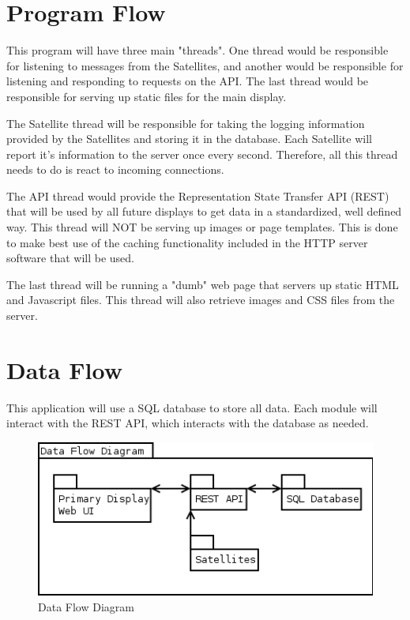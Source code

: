 \section{Program Flow}

This program will have three main "threads".
One thread would be responsible for listening to messages from the Satellites, and another would be responsible for listening and responding to requests on the \ac{API}.
The last thread would be responsible for serving up static files for the main display.

The Satellite thread will be responsible for taking the logging information provided by the Satellites and storing it in the database.
Each Satellite will report it's information to the server once every second.
Therefore, all this thread needs to do is react to incoming connections.

The \ac{API} thread would provide the Representation State Transfer \ac{API} (\ac{REST}) that will be used by all future displays to get data in a standardized, well defined way.
This thread will NOT be serving up images or page templates.
This is done to make best use of the caching functionality included in the HTTP server software that will be used.

The last thread will be running a "dumb" web page that servers up static HTML and Javascript files.
This thread will also retrieve images and \ac{CSS} files from the server.

\section{Data Flow}

This application will use a \ac{SQL} database to store all data.
Each module will interact with the \ac{REST} \ac{API}, which interacts with the database as needed.

\begin{figure}[H]
\centering
\includegraphics[scale=0.75]{Software/images/DataFlowDiagram.png}
\caption{Data Flow Diagram}
\label{img:S_DataFlowDiagram}
\end{figure}

